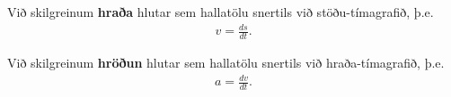\ifdefined \wholebook \else\documentclass[oneside]{book}\usepackage{EdlBook}\graphicspath{{figures/}}
\begin{document}
\begin{tcolorbox}
\begin{definition}
Við skilgreinum \textbf{hraða} hlutar sem hallatölu snertils við stöðu-tímagrafið, þ.e.~
\begin{align*}
    v = \frac{ds}{dt}.
\end{align*}
\end{definition}
\end{tcolorbox}
\begin{tcolorbox}
\begin{definition}
Við skilgreinum \textbf{hröðun} hlutar sem hallatölu snertils við hraða-tímagrafið, þ.e.~
\begin{align*}
    a = \frac{dv}{dt}.
\end{align*}
\end{definition}
\end{tcolorbox}
\end{document}
